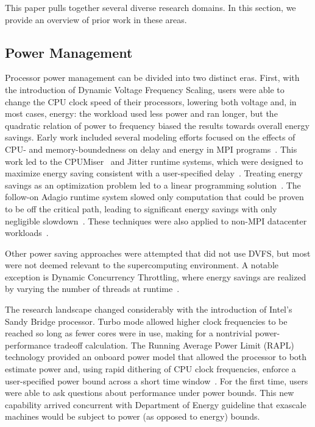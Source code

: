 This paper pulls together several diverse research domains. In this section,
we provide an overview of prior work in these areas.

\subsection{Power Management}
Processor power management can be divided into two distinct eras. First, with 
the introduction of Dynamic Voltage Frequency Scaling, users were able to 
change the CPU clock speed of their processors, lowering both voltage and,
in most cases, energy: the workload used less power and ran longer, but the
quadratic relation of power to frequency biased the results towards overall
energy savings. Early work included several modeling efforts focused on
the effects of CPU- and memory-boundedness on delay and energy in MPI programs~\cite{SpringerPPoPP2006,GeICPP2007,LiHPCA2006,CameronSC2005,HsuSC2005}. 
This work led to the CPUMiser~\cite{GeICPP2007} and Jitter runtime systems, which were designed 
to maximize energy saving consistent with a user-specified delay~\cite{KappiahSC2005}.
Treating energy savings as an optimization problem led to a linear programming
solution~\cite{rountree:07}. The follow-on Adagio runtime system slowed only
computation that could be proven to be off the critical path, leading to significant
energy savings with only negligible slowdown~\cite{rountree:09}. These 
techniques were also applied to non-MPI datacenter workloads~\cite{femal:04}. 

Other power saving approaches were attempted that did not use DVFS, but most
were not deemed relevant to the supercomputing environment. A notable exception
is Dynamic Concurrency Throttling, where energy savings are realized by varying
the number of threads at runtime~\cite{Curtis1,Curtis2,Curtis3,porterfield2013power}.

The research landscape changed considerably with the introduction of Intel's
Sandy Bridge processor. Turbo mode allowed higher clock frequencies to be
reached so long as fewer cores were in use, making for a nontrivial power- performance tradeoff
calculation. The Running Average Power Limit (RAPL) technology provided an onboard power model that allowed the processor to both
estimate power and, using rapid dithering of CPU clock frequencies, enforce a
user-specified power bound across a short time window~\cite{IntelSDM,David2010}. 
For the first time, users were able to ask questions about performance under 
power bounds. This new capability arrived concurrent with Department of Energy
guideline that exascale machines would be subject to power (as opposed to energy) bounds.

